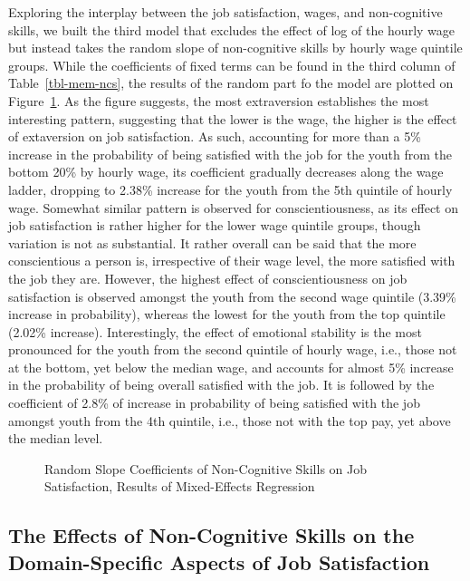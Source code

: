 \documentclass[
]{interact}
\begin{document}
Exploring the interplay between the job satisfaction, wages, and
non-cognitive skills, we built the third model that excludes the effect
of log of the hourly wage but instead takes the random slope of
non-cognitive skills by hourly wage quintile groups. While the
coefficients of fixed terms can be found in the third column of
Table~\ref{tbl-mem-ncs}, the results of the random part fo the model are
plotted on Figure~\ref{fig-wages-ncs}. As the figure suggests, the most
extraversion establishes the most interesting pattern, suggesting that
the lower is the wage, the higher is the effect of extaversion on job
satisfaction. As such, accounting for more than a 5\% increase in the
probability of being satisfied with the job for the youth from the
bottom 20\% by hourly wage, its coefficient gradually decreases along
the wage ladder, dropping to 2.38\% increase for the youth from the 5th
quintile of hourly wage. Somewhat similar pattern is observed for
conscientiousness, as its effect on job satisfaction is rather higher
for the lower wage quintile groups, though variation is not as
substantial. It rather overall can be said that the more conscientious a
person is, irrespective of their wage level, the more satisfied with the
job they are. However, the highest effect of conscientiousness on job
satisfaction is observed amongst the youth from the second wage quintile
(3.39\% increase in probability), whereas the lowest for the youth from
the top quintile (2.02\% increase). Interestingly, the effect of
emotional stability is the most pronounced for the youth from the second
quintile of hourly wage, i.e., those not at the bottom, yet below the
median wage, and accounts for almost 5\% increase in the probability of
being overall satisfied with the job. It is followed by the coefficient
of 2.8\% of increase in probability of being satisfied with the job
amongst youth from the 4th quintile, i.e., those not with the top pay,
yet above the median level.

\begin{figure}


\caption{\label{fig-wages-ncs}Random Slope Coefficients of Non-Cognitive
Skills on Job Satisfaction, Results of Mixed-Effects Regression}

\end{figure}%

\subsection{The Effects of Non-Cognitive Skills on the Domain-Specific
Aspects of Job
Satisfaction}\label{the-effects-of-non-cognitive-skills-on-the-domain-specific-aspects-of-job-satisfaction}
\end{document}
